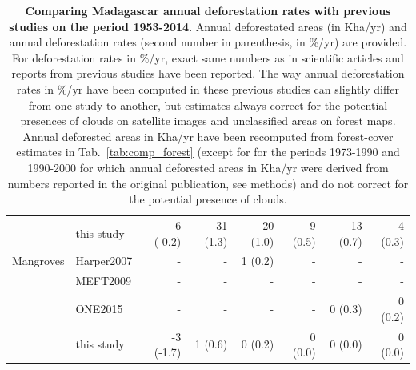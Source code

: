 \documentclass[a4paper, 12pt, leqno]{article} %
\begin{document}
\begin{table}[!h]
\begin{longtable}[]{@{}llrrrrrr@{}}
                & this study & -6 (-0.2) & 31 (1.3) & 20 (1.0) & 9 (0.5) & 13 (0.7) & 4
                                                                                      (0.3) \\
    Mangroves & Harper2007 & - & - & 1 (0.2) & - & - & - \\
                & MEFT2009 & - & - & - & - & - & - \\
                & ONE2015 & - & - & - & - & 0 (0.3) & 0 (0.2) \\
                & this study & -3 (-1.7) & 1 (0.6) & 0 (0.2) & 0 (0.0) & 0 (0.0) & 0
                                                                                   (0.0) \\
    \bottomrule
  \end{longtable}%
  \addtocounter{table}{-1}

  \caption{\textbf{Comparing Madagascar annual deforestation rates
      with previous studies on the period 1953-2014}. Annual
    deforestated areas (in Kha/yr) and annual deforestation rates
    (second number in parenthesis, in \%/yr) are provided. For
    deforestation rates in \%/yr, exact same numbers as in scientific
    articles and reports from previous studies \citep{Harper2007,
      MEFT2009, ONE2015} have been reported. The way annual
    deforestation rates in \%/yr have been computed in these previous
    studies can slightly differ from one study to another, but
    estimates always correct for the potential presences of clouds on
    satellite images and unclassified areas on forest maps. Annual
    deforested areas in Kha/yr have been recomputed from forest-cover
    estimates in Tab.~\ref{tab:comp_forest} (except for
    \citet{Harper2007} for the periods 1973-1990 and 1990-2000 for
    which annual deforested areas in Kha/yr were derived from numbers
    reported in the original publication, see methods) and do not
    correct for the potential presence of clouds.  }

  \label{tab:comp_defor}
\end{table}

\newpage
\end{document}
